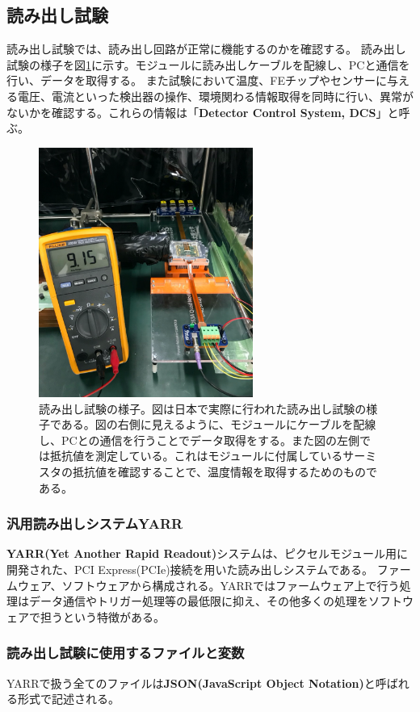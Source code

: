 \clearpage
\subsection{読み出し試験}
読み出し試験では、読み出し回路が正常に機能するのかを確認する。
読み出し試験の様子を図\ref{readout_overview}に示す。モジュールに読み出しケーブルを配線し、PCと通信を行い、データを取得する。
また試験において温度、FEチップやセンサーに与える電圧、電流といった検出器の操作、環境関わる情報取得を同時に行い、異常がないかを確認する。これらの情報は「\textbf{Detector Control System, DCS}」と呼ぶ。

\begin{figure}[bpt]\centering
\includegraphics[width=7cm]{./readout_overview.png}
\caption[読み出し試験の様子]{読み出し試験の様子。図は日本で実際に行われた読み出し試験の様子である。図の右側に見えるように、モジュールにケーブルを配線し、PCとの通信を行うことでデータ取得をする。また図の左側では抵抗値を測定している。これはモジュールに付属しているサーミスタの抵抗値を確認することで、温度情報を取得するためのものである。}
\label{readout_overview}
\end{figure}

\subsubsection{汎用読み出しシステムYARR}
\textbf{YARR(Yet Another Rapid Readout)}システム\cite{3-3}は、ピクセルモジュール用に開発された、PCI Express(PCIe)接続を用いた読み出しシステムである。
ファームウェア、ソフトウェアから構成される。YARRではファームウェア上で行う処理はデータ通信やトリガー処理等の最低限に抑え、その他多くの処理をソフトウェアで担うという特徴がある。

\clearpage
\subsubsection{読み出し試験に使用するファイルと変数}
YARRで扱う全てのファイルは\textbf{JSON(JavaScript Object Notation)}と呼ばれる形式で記述される。

